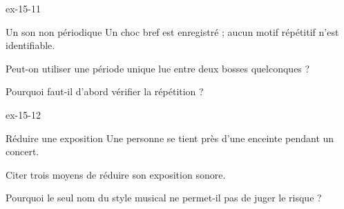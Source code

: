\begin{blocLivre}{ex-15-11}\begin{exercice}[3]{Un son non périodique}
Un choc bref est enregistré ; aucun motif répétitif n’est identifiable.
\begin{questions}
\item Peut-on utiliser une période unique lue entre deux bosses quelconques ?
\item Pourquoi faut-il d’abord vérifier la répétition ?
\end{questions}
\end{exercice}\end{blocLivre}
\begin{blocLivre}{ex-15-12}\begin{exercice}[3]{Réduire une exposition}
Une personne se tient près d’une enceinte pendant un concert.
\begin{questions}
\item Citer trois moyens de réduire son exposition sonore.
\item Pourquoi le seul nom du style musical ne permet-il pas de juger le risque ?
\end{questions}
\end{exercice}\end{blocLivre}

